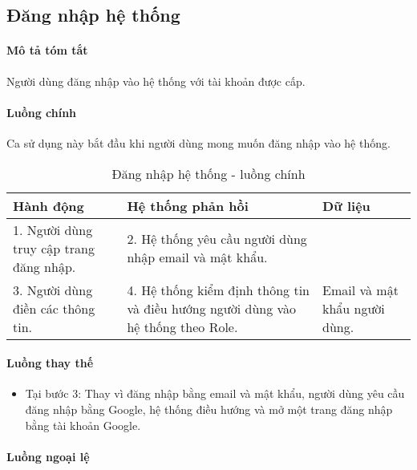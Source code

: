 \documentclass[./../main.tex]{subfiles}
\begin{document}
\subsection{Đăng nhập hệ thống}

\paragraph*{Mô tả tóm tắt}

Người dùng đăng nhập vào hệ thống với tài khoản được cấp.

\paragraph*{Luồng chính} Ca sử dụng này bắt đầu khi người dùng mong muốn đăng
nhập vào hệ thống.

\begin{table}[H]
    \caption{Đăng nhập hệ thống - luồng chính}
    \label{tab:login_flow_main}
	\begin{tabularx}{\textwidth}{|X|X|X|}
		\hline
		\textbf{Hành động}                         & \textbf{Hệ thống phản hồi}                                                                      & \textbf{Dữ liệu}                   \\ \hline
		1. Người dùng truy cập trang đăng nhập. & 2. Hệ thống yêu cầu người dùng nhập email và mật khẩu.                                   &                                        \\ \hline
		3. Người dùng điền các thông tin.        & 4. Hệ thống kiểm định thông tin và điều hướng người dùng vào hệ thống theo Role. & Email và mật khẩu người dùng. \\ \hline
	\end{tabularx}
\end{table}

\paragraph*{Luồng thay thế}

\begin{itemize}
	\item
	      	Tại bước 3: Thay vì đăng nhập bằng email và mật khẩu, người dùng yêu
	      	cầu đăng nhập bằng Google, hệ thống điều hướng và mở một trang đăng
	      	nhập bằng tài khoản Google.
\end{itemize}

\paragraph*{Luồng ngoại lệ}
\end{document}
